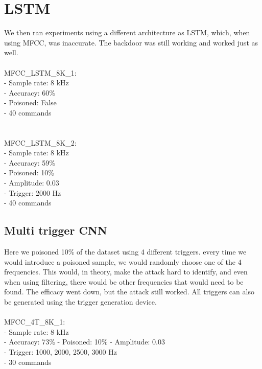 \documentclass{article}
\theoremstyle{definition}
\theoremstyle{remark}
\begin{document}
\section{LSTM}
We then ran experiments using a different architecture as LSTM, which, when using MFCC, was inaccurate. The backdoor was still working and worked just as well.
\\\\
MFCC\_LSTM\_8K\_1:\\
- Sample rate: 8 kHz\\
- Accuracy: 60\%\\
- Poisoned: False\\
- 40 commands\\
\\\\
MFCC\_LSTM\_8K\_2:\\
- Sample rate: 8 kHz\\
- Accuracy: 59\%\\
- Poisoned: 10\%\\
- Amplitude: 0.03\\
- Trigger: 2000 Hz\\
- 40 commands\\

\subsection{Multi trigger CNN}
Here we poisoned 10\% of the dataset using 4 different triggers. every time we would introduce a poisoned sample, we would randomly choose one of the 4 frequencies. This would, in theory, make the attack hard to identify, and even when using filtering, there would be other frequencies that would need to be found. The efficacy went down, but the attack still worked. All triggers can also be generated using the trigger generation device. 
\\\\
MFCC\_4T\_8K\_1:\\
- Sample rate: 8 kHz\\
- Accuracy: 73\%
- Poisoned: 10\%
- Amplitude: 0.03\\
- Trigger: 1000, 2000, 2500, 3000 Hz\\
- 30 commands\\
\end{document}
